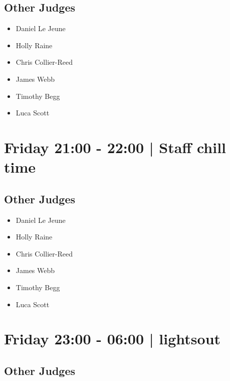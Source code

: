 \documentclass[10pt, A5]{article}
\begin{document}
                
        \subsection*{Other Judges}
        
            \begin{itemize}
                            \item Daniel Le Jeune
                            \item Holly Raine
                            \item Chris Collier-Reed
                            \item James Webb
                            \item Timothy Begg
                            \item Luca Scott
                        \end{itemize}
        

            \section*{Friday 21:00
        -
        22:00
        |
         Staff chill time}
        
                
        \subsection*{Other Judges}
        
            \begin{itemize}
                            \item Daniel Le Jeune
                            \item Holly Raine
                            \item Chris Collier-Reed
                            \item James Webb
                            \item Timothy Begg
                            \item Luca Scott
                        \end{itemize}
        

            \section*{Friday 23:00
        -
        06:00
        |
         lightsout}
        
                
        \subsection*{Other Judges}
        
\end{document}
